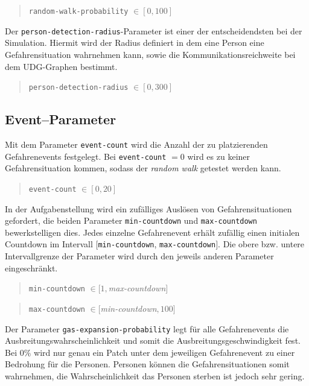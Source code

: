 \begin{quote}
\verb|random-walk-probability| $\in [0, 100]$
\end{quote}

Der \verb|person-detection-radius|-Parameter ist einer der entscheidendsten bei der Simulation. Hiermit wird der Radius definiert in dem eine Person eine Gefahrensituation wahrnehmen kann, sowie die Kommunikationsreichweite bei dem UDG-Graphen bestimmt.

\begin{quote}
\verb|person-detection-radius| $\in [0, 300]$
\end{quote}



\subsection{Event--Parameter}
\label{sec:gui_event}

Mit dem Parameter \verb|event-count| wird die Anzahl der zu platzierenden Gefahrenevents festgelegt. Bei \verb|event-count| $ = 0$ wird es zu keiner Gefahrensituation kommen, sodass der \emph{random walk} getestet werden kann.

\begin{quote}
\verb|event-count| $\in [0, 20]$
\end{quote}

In der Aufgabenstellung wird ein zufälliges Auslösen von Gefahrensituationen gefordert, die beiden Parameter \verb|min-countdown| und \verb|max-countdown| bewerkstelligen dies. Jedes einzelne Gefahrenevent erhält zufällig einen initialen Countdown im Intervall $[$\verb|min-countdown|, \verb|max-countdown|$]$. Die obere bzw. untere Intervallgrenze der Parameter wird durch den jeweils anderen Parameter eingeschränkt.  

\begin{quote}
\verb|min-countdown| $\in [1, $\textit{max-countdown}$]$
\end{quote}

\begin{quote}
\verb|max-countdown| $\in [$\textit{min-countdown}$, 100]$
\end{quote}

Der Parameter \verb|gas-expansion-probability| legt für alle Gefahrenevents die Ausbreitungswahrscheinlichkeit und somit die Ausbreitungsgeschwindigkeit fest. Bei $0 \%$ wird nur genau ein Patch unter dem jeweiligen Gefahrenevent zu einer Bedrohung für die Personen. Personen können die Gefahrensituationen somit wahrnehmen, die Wahrscheinlichkeit das Personen sterben ist jedoch sehr gering. 

